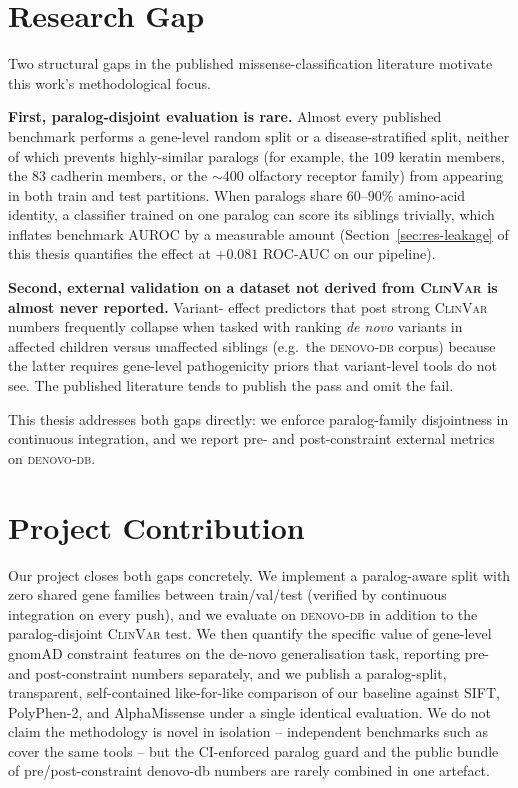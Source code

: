 \documentclass[11pt,a4paper,oneside]{report}
\begin{document}
\section{Research Gap}
\label{sec:rw-gap}

Two structural gaps in the published missense-classification
literature motivate this work's methodological focus.

\textbf{First, paralog-disjoint evaluation is rare.} Almost
every published benchmark performs a gene-level random split
or a disease-stratified split, neither of which prevents
highly-similar paralogs (for example, the $109$ keratin
members, the $83$ cadherin members, or the $\sim$$400$
olfactory receptor family) from appearing in both train and
test partitions. When paralogs share $60$--$90\%$ amino-acid
identity, a classifier trained on one paralog can score its
siblings trivially, which inflates benchmark AUROC by a
measurable amount (Section~\ref{sec:res-leakage} of this
thesis quantifies the effect at $+0.081$ ROC-AUC on our
pipeline).

\textbf{Second, external validation on a dataset not derived
from \textsc{ClinVar} is almost never reported.} Variant-
effect predictors that post strong \textsc{ClinVar} numbers
frequently collapse when tasked with ranking \emph{de novo}
variants in affected children versus unaffected siblings
(e.g.\ the \textsc{denovo-db} corpus) because the latter
requires gene-level pathogenicity priors that variant-level
tools do not see. The published literature tends to publish
the pass and omit the fail.

This thesis addresses both gaps directly: we enforce
paralog-family disjointness in continuous integration, and
we report pre- and post-constraint external metrics on
\textsc{denovo-db}.

\section{Project Contribution}
\label{sec:rw-contribution}

Our project closes both gaps concretely. We implement a
paralog-aware split with zero shared gene families
between train/val/test (verified by continuous
integration on every push), and we evaluate on
\textsc{denovo-db} in addition to the paralog-disjoint
\textsc{ClinVar} test. We then quantify the specific
value of gene-level gnomAD constraint features on the
de-novo generalisation task, reporting pre- and
post-constraint numbers separately, and we publish a
paralog-split, transparent, self-contained like-for-like
comparison of our baseline against SIFT, PolyPhen-2, and
AlphaMissense under a single identical evaluation. We do
not claim the methodology is novel in isolation -- independent
benchmarks such as \citet{livesey2023benchmark} cover the
same tools -- but the CI-enforced paralog guard and the
public bundle of pre/post-constraint denovo-db numbers are
rarely combined in one artefact.
\end{document}
